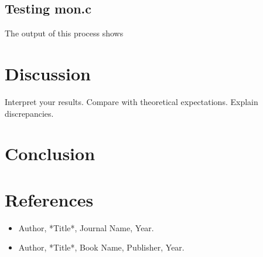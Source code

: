 \documentclass[12pt]{article}
\begin{document}
\subsection{Testing mon.c}\label{subsec:testing-mon.c}
\noindent
The output of this process shows


\section{Discussion}\label{sec:discussion}
Interpret your results.
Compare with theoretical expectations.
Explain discrepancies.

\section{Conclusion}\label{sec:conclusion}



\section*{References}
\begin{itemize}
    \item Author, *Title*, Journal Name, Year.
    \item Author, *Title*, Book Name, Publisher, Year.
\end{itemize}
\end{document}
